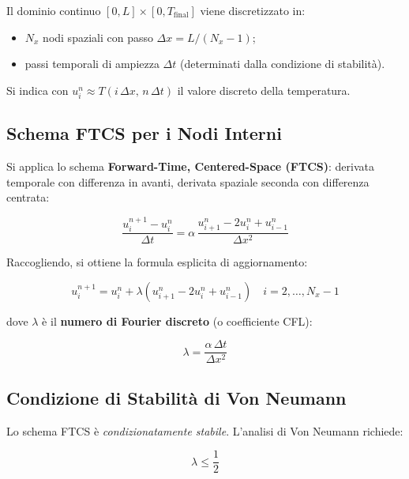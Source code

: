 \documentclass[11pt, a4paper]{article}
\begin{document}
Il dominio continuo $[0,L] \times [0, T_\text{final}]$ viene discretizzato in:
\begin{itemize}
  \item $N_x$ nodi spaziali con passo $\Delta x = L / (N_x - 1)$;
  \item passi temporali di ampiezza $\Delta t$ (determinati dalla condizione di stabilità).
\end{itemize}

Si indica con $u_i^n \approx T(i\,\Delta x,\, n\,\Delta t)$ il valore discreto della temperatura.

\subsection{Schema FTCS per i Nodi Interni}

Si applica lo schema \textbf{Forward-Time, Centered-Space (FTCS)}: derivata temporale con differenza in avanti, derivata spaziale seconda con differenza centrata:

\begin{equation}
  \frac{u_i^{n+1} - u_i^n}{\Delta t} = \alpha \, \frac{u_{i+1}^n - 2u_i^n + u_{i-1}^n}{\Delta x^2}
  \label{eq:ftcs}
\end{equation}

Raccogliendo, si ottiene la formula esplicita di aggiornamento:

\begin{equation}
  \boxed{
    u_i^{n+1} = u_i^n + \lambda \left( u_{i+1}^n - 2u_i^n + u_{i-1}^n \right)
  }
  \quad i = 2, \ldots, N_x - 1
  \label{eq:ftcs_explicit}
\end{equation}

dove $\lambda$ è il \textbf{numero di Fourier discreto} (o coefficiente CFL):

\begin{equation}
  \lambda = \frac{\alpha\, \Delta t}{\Delta x^2}
  \label{eq:lambda}
\end{equation}

\subsection{Condizione di Stabilità di Von Neumann}

Lo schema FTCS è \emph{condizionatamente stabile}. L'analisi di Von Neumann richiede:

\begin{equation}
  \lambda \leq \frac{1}{2}
  \label{eq:stability}
\end{equation}
\end{document}
